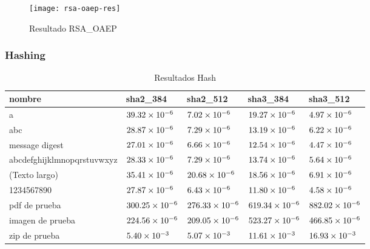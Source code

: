 \documentclass[../main.tex]{subfiles}
\begin{document}
\begin{figure}
  \centering
  \texttt{[image: rsa-oaep-res]}
  \caption{Resultado RSA\_OAEP}\label{fig:rsa-oaep}
\end{figure}

\subsubsection{Hashing}\label{sec:hash}
\begin{table*}[]
  \centering
  \caption{Resultados Hash}\label{tab:hash-res}
  \begin{tabular}{|m{2cm}<{\centering}|m{2cm}<{\centering}|m{2cm}<{\centering}|m{2cm}<{\centering}|m{2cm}<{\centering}|}
    \hline
    \rowcolor[HTML]{000000}
    {\color[HTML]{FFFFFF} nombre} & {\color[HTML]{FFFFFF} sha2\_384} & {\color[HTML]{FFFFFF} sha2\_512} & {\color[HTML]{FFFFFF} sha3\_384} & {\color[HTML]{FFFFFF} sha3\_512} \\ \hline
    a                          & $\num{39.32E-06}$  & $\num{7.02E-06 }$  & $\num{19.27E-06}$  & $\num{4.97E-06}$   \\ \hline
    \rowcolor[HTML]{C0C0C0}
    abc                        & $\num{28.87E-06}$  & $\num{7.29E-06 }$  & $\num{13.19E-06}$  & $\num{6.22E-06}$   \\ \hline
    message digest             & $\num{27.01E-06}$  & $\num{6.66E-06 }$  & $\num{12.54E-06}$  & $\num{4.47E-06}$   \\ \hline
    \rowcolor[HTML]{C0C0C0}
    abcdefghijklmnopqrstuvwxyz & $\num{28.33E-06}$  & $\num{7.29E-06 }$  & $\num{13.74E-06}$  & $\num{5.64E-06}$   \\ \hline
    (Texto largo)              & $\num{35.41E-06}$  & $\num{20.68E-06}$  & $\num{18.56E-06}$  & $\num{6.91E-06}$   \\ \hline
    \rowcolor[HTML]{C0C0C0}
    1234567890                 & $\num{27.87E-06}$  & $\num{6.43E-06 }$  & $\num{11.80E-06}$  & $\num{4.58E-06}$   \\ \hline
    pdf de prueba              & $\num{300.25E-06}$ & $\num{276.33E-06}$ & $\num{619.34E-06}$ & $\num{882.02E-06}$ \\ \hline
    \rowcolor[HTML]{C0C0C0}
    imagen de prueba           & $\num{224.56E-06}$ & $\num{209.05E-06}$ & $\num{523.27E-06}$ & $\num{466.85E-06}$ \\ \hline
    zip de prueba              & $\num{5.40E-03 }$  & $\num{5.07E-03 }$  & $\num{11.61E-03}$  & $\num{16.93E-03}$  \\ \hline
  \end{tabular}
\end{table*}
\end{document}
